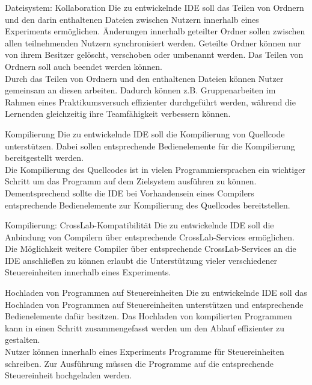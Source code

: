 \begin{requirement}{Dateisystem: Kollaboration}
    \reqdescription Die zu entwickelnde IDE soll das Teilen von Ordnern und den darin enthaltenen Dateien zwischen Nutzern innerhalb eines Experiments ermöglichen. Änderungen innerhalb geteilter Ordner sollen zwischen allen teilnehmenden Nutzern synchronisiert werden. Geteilte Ordner können nur von ihrem Besitzer gelöscht, verschoben oder umbenannt werden. Das Teilen von Ordnern soll auch beendet werden können. \\
    \reqrationale Durch das Teilen von Ordnern und den enthaltenen Dateien können Nutzer gemeinsam an diesen arbeiten. Dadurch können z.B. Gruppenarbeiten im Rahmen eines Praktikumsversuch effizienter durchgeführt werden, während die Lernenden gleichzeitig ihre Teamfähigkeit verbessern können. \\
\end{requirement}

\begin{requirement}{Kompilierung}
    \reqdescription Die zu entwickelnde IDE soll die Kompilierung von Quellcode unterstützen. Dabei sollen entsprechende Bedienelemente für die Kompilierung bereitgestellt werden.  \\
    \reqrationale Die Kompilierung des Quellcodes ist in vielen Programmiersprachen ein wichtiger Schritt um das Programm auf dem Zielsystem ausführen zu können. Dementsprechend sollte die IDE bei Vorhandensein eines Compilers entsprechende Bedienelemente zur Kompilierung des Quellcodes bereitstellen. \\
\end{requirement}

\begin{requirement}{Kompilierung: CrossLab-Kompatibilität}
    \reqdescription Die zu entwickelnde IDE soll die Anbindung von Compilern über entsprechende CrossLab-Services ermöglichen. \\
    \reqrationale Die Möglichkeit weitere Compiler über entsprechende CrossLab-Services an die IDE anschließen zu können erlaubt die Unterstützung vieler verschiedener Steuereinheiten innerhalb eines Experiments. \\
\end{requirement}

\begin{requirement}{Hochladen von Programmen auf Steuereinheiten}
    \reqdescription Die zu entwickelnde IDE soll das Hochladen von Programmen auf Steuereinheiten unterstützen und entsprechende Bedienelemente dafür besitzen. Das Hochladen von kompilierten Programmen kann in einen Schritt zusammengefasst werden um den Ablauf effizienter zu gestalten. \\
    \reqrationale Nutzer können innerhalb eines Experiments Programme für Steuereinheiten schreiben. Zur Ausführung müssen die Programme auf die entsprechende Steuereinheit hochgeladen werden.  \\
\end{requirement}

